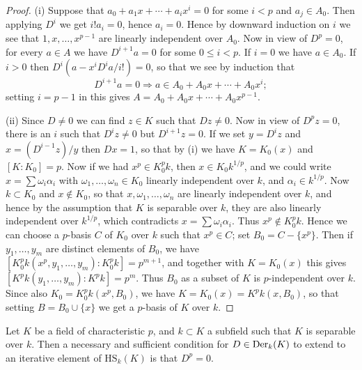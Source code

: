 \begin{proof}
(i) Suppose that $a_0 + a_1x + \cdots + a_ix^i = 0$ for some $i < p$ and $a_j \in A_0$.
Then applying $D^i$ we get $i!a_i = 0$, hence $a_i = 0$. Hence by downward induction
on $i$ we see that $1, x, \ldots, x^{p-1}$ are linearly independent over $A_0$. Now in
view of $D^p = 0$, for every $a \in A$ we have $D^{i+1}a = 0$ for some $0 \le i < p$. If
$i = 0$ we have $a \in A_0$. If $i > 0$ then $D^i(a - x^iD^ia/i!) = 0$, so that we see by
induction that
\[
  D^{i+1}a = 0 \Rightarrow a \in A_0 + A_0x + \cdots + A_0x^i;
\]
setting $i = p - 1$ in this gives $A = A_0 + A_0x + \cdots + A_0x^{p-1}$.

(ii) Since $D \ne 0$ we can find $z \in K$ such that $Dz \ne 0$. Now in view of
$D^pz = 0$, there is an $i$ such that $D^iz \ne 0$ but $D^{i+1}z = 0$. If we set $y = D^iz$
and $x = (D^{i-1}z)/y$ then $Dx = 1$, so that by (i) we have $K = K_0(x)$ and
$[K : K_0] = p$. Now if we had $x^p \in K_0^pk$, then $x \in K_0k^{1/p}$, and we could
write $x = \sum \omega_i\alpha_i$ with $\omega_1, \ldots, \omega_n \in K_0$ linearly independent over
$k$, and $\alpha_i \in k^{1/p}$. Now $k \subset K_0$ and $x \notin K_0$, so that
$x, \omega_1, \ldots, \omega_n$ are linearly independent over $k$, and hence by the assumption
that $K$ is separable over $k$, they are also linearly independent over $k^{1/p}$,
which contradicts $x = \sum \omega_i\alpha_i$. Thus $x^p \notin K_0^pk$. Hence we can
choose a $p$-basis $C$ of $K_0$ over $k$ such that $x^p \in C$; set $B_0 = C - \{x^p\}$. Then
if $y_1, \ldots, y_m$ are distinct elements of $B_0$, we have
$[K_0^pk(x^p, y_1, \ldots, y_m) : K_0^pk] = p^{m+1}$, and together with $K = K_0(x)$ this
gives $[K^pk(y_1, \ldots, y_m) : K^pk] = p^m$. Thus $B_0$ as a subset of $K$ is
$p$-independent over $k$. Since also $K_0 = K_0^pk(x^p, B_0)$, we have
$K = K_0(x) = K^pk(x, B_0)$, so that setting $B = B_0 \cup \{x\}$ we get a $p$-basis of $K$
over $k$.
\end{proof}

\begin{theorem}\label{thm:27.4}
Let $K$ be a field of characteristic $p$, and $k \subset K$ a subfield such that $K$ is
separable over $k$. Then a necessary and sufficient condition for $D \in \operatorname{Der}_k(K)$
to extend to an iterative element of $\mathrm{HS}_k(K)$ is that $D^p = 0$.
\end{theorem}

